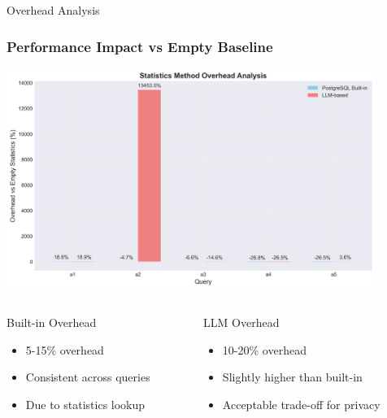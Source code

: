 \documentclass{beamer}
\begin{document}
\begin{frame}{Overhead Analysis}
\frametitle{Performance Impact vs Empty Baseline}

\begin{center}
\includegraphics[width=0.9\textwidth]{images/overhead_analysis.png}
\end{center}

\begin{columns}[T]
\begin{column}{0.5\textwidth}
\begin{block}{Built-in Overhead}
\begin{itemize}
    \item 5-15\% overhead
    \item Consistent across queries
    \item Due to statistics lookup
\end{itemize}
\end{block}
\end{column}

\begin{column}{0.5\textwidth}
\begin{block}{LLM Overhead}
\begin{itemize}
    \item 10-20\% overhead
    \item Slightly higher than built-in
    \item Acceptable trade-off for privacy
\end{itemize}
\end{block}
\end{column}
\end{columns}


\end{frame}
\end{document}
